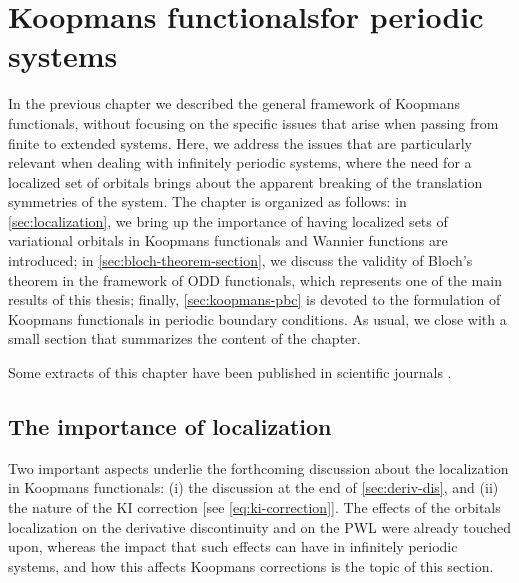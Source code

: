 \cleardoublepage
\chapter[Koopmans functionals for periodic systems]{Koopmans functionals\break for periodic systems\label{ch:koopmans-periodic}}
In the previous chapter we described the general framework of Koopmans functionals, without focusing on the specific issues that arise when passing from finite to extended systems. Here, we address the issues that are particularly relevant when dealing with infinitely periodic systems, where the need for a localized set of orbitals brings about the apparent breaking of the translation symmetries of the system. The chapter is organized as follows: in \cref{sec:localization}, we bring up the importance of having localized sets of variational orbitals in Koopmans functionals and Wannier functions are introduced; in \cref{sec:bloch-theorem-section}, we discuss the validity of Bloch's theorem in the framework of ODD functionals, which represents one of the main results of this thesis; finally, \cref{sec:koopmans-pbc} is devoted to the formulation of Koopmans functionals in periodic boundary conditions. As usual, we close with a small section that summarizes the content of the chapter.

Some extracts of this chapter have been published in scientific journals \cite{de_gennaro_blochs_2022,colonna_koopmans_2022}.

\clearpage
\section{The importance of localization\label{sec:localization}}
Two important aspects underlie the forthcoming discussion about the localization in Koopmans functionals: (i) the discussion at the end of \cref{sec:deriv-dis}, and (ii) the nature of the KI correction [see \cref{eq:ki-correction}]. The effects of the orbitals localization on the derivative discontinuity and on the PWL were already touched upon, whereas the impact that such effects can have in infinitely periodic systems, and how this affects Koopmans corrections is the topic of this section.

